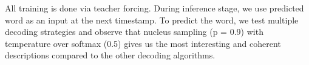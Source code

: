 \documentclass[11pt,a4paper]{article}
\begin{document}
All training is done via teacher forcing. During inference stage, we use predicted word as an input at the next timestamp. To predict the word, we test multiple decoding strategies and observe that nucleus sampling (p = 0.9) \cite{holtzman2019curious} with temperature over softmax (0.5) gives us the most interesting and coherent descriptions compared to the other decoding algorithms.


\end{document}
